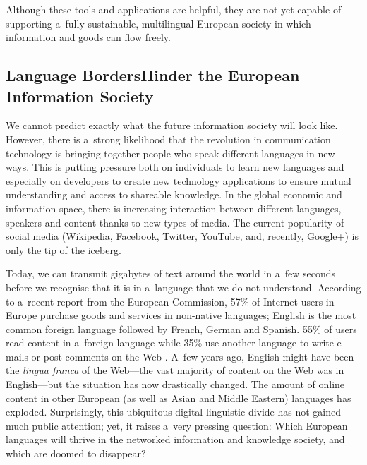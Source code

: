 \begin{multicols}{2}
Although these tools and applications are helpful, they are not yet
capable of supporting a~fully-sustainable, multilingual European
society in which information and goods can flow freely. 

\subsection[Language Borders Hinder the European Information
Society]{Language Borders\newline Hinder the European Information
Society} 

We cannot predict exactly what the future information society will
look like. However, there is a~strong likelihood that the revolution
in communication technology is bringing together people who speak
different languages in new ways. This is putting pressure both on
individuals to learn new languages and especially on developers to
create new technology applications to ensure mutual understanding and
access to shareable knowledge. In the global economic and information
space, there is increasing interaction between different languages,
speakers and content thanks to new types of media. The current
popularity of social media (Wikipedia, Facebook, Twitter, YouTube,
and, recently, Google+) is only the tip of the iceberg. 


Today, we can transmit gigabytes of text around the world in a~few
seconds before we recognise that it is in a~language that we do not
understand. According to a~recent report from the European Commission,
57\% of Internet users in Europe purchase goods and services in
non-native languages; English is the most common foreign language
followed by French, German and Spanish. 55\% of users read content in
a~foreign language while 35\% use another language to write e-mails or
post comments on the Web \cite{EC1}. A~few years ago, English might
have been the \textit{lingua franca} of the Web—the vast majority of
content on the Web was in English—but the situation has now
drastically changed. The amount of online content in other European
(as well as Asian and Middle Eastern) languages has ex\-plo\-ded.
Surprisingly, this ubiquitous digital linguistic divide has not gained
much public attention; yet, it raises a~very pressing question: Which
European languages will thrive in the networked information and
knowledge society, and which are doomed to disappear? 


\end{multicols}

